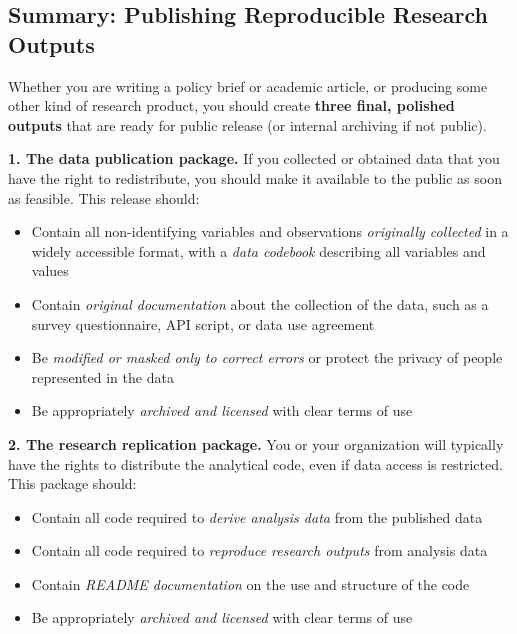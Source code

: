 \documentclass[
]{book}
\providecommand{\tightlist}{%
  \setlength{\itemsep}{0pt}\setlength{\parskip}{0pt}}
\begin{document}
\begin{summary}
\hypertarget{summary-publishing-reproducible-research-outputs}{%
\subsection*{Summary: Publishing Reproducible Research Outputs}\label{summary-publishing-reproducible-research-outputs}}

Whether you are writing a policy brief or academic article, or producing some other kind of research product, you should create \textbf{three final, polished outputs} that are ready for public release (or internal archiving if not public).

\textbf{1. The data publication package.} If you collected or obtained data that you have the right to redistribute, you should make it available to the public as soon as feasible. This release should:

\begin{itemize}
\tightlist
\item
  Contain all non-identifying variables and observations \emph{originally collected} in a widely accessible format, with a \emph{data codebook} describing all variables and values
\item
  Contain \emph{original documentation} about the collection of the data, such as a survey questionnaire, API script, or data use agreement
\item
  Be \emph{modified or masked only to correct errors} or protect the privacy of people represented in the data
\item
  Be appropriately \emph{archived and licensed} with clear terms of use
\end{itemize}

\textbf{2. The research replication package.} You or your organization will typically have the rights to distribute the analytical code, even if data access is restricted. This package should:

\begin{itemize}
\tightlist
\item
  Contain all code required to \emph{derive analysis data} from the published data
\item
  Contain all code required to \emph{reproduce research outputs} from analysis data
\item
  Contain \emph{README documentation} on the use and structure of the code
\item
  Be appropriately \emph{archived and licensed} with clear terms of use
\end{itemize}


\end{summary}
\end{document}
